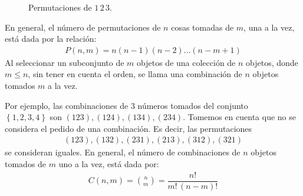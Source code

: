 \documentclass[hidelinks,12pt]{article}
\begin{document}
\begin{figure}[H]
    \centering
    \hspace{2cm}
    \caption{Permutaciones de $1 \, 2 \, 3$.}
    \label{fig:figura_01_01}
\end{figure}
En general, el número de permutaciones de $n$ cosas tomadas de $m$, una a la vez, está dada por la relación:
\begin{align*}
P (n, m) = n (n - 1)(n - 2) \ldots (n - m +1)
\end{align*}
Al seleccionar un subconjunto de $m$ objetos de una colección de $n$ objetos, donde $m \leq n$, sin tener en cuenta el orden, se llama una combinación de $n$ objetos tomados $m$ a la vez.
\par
Por ejemplo, las combinaciones de $3$ números tomados del conjunto \\ $\left\{ 1, 2, 3, 4 \right\}$ son $(123), (124), (134), (234)$. Tomemos en cuenta que no se considera el pedido de una combinación. Es decir, las permutaciones
\begin{align*}
(123), (132), (231), (213), (312), (321)
\end{align*}
se consideran iguales. En general, el número de combinaciones de $n$ objetos tomados de $m$ uno a la vez, está dada por:
\begin{align*}
C(n, m) = \binom{n}{m} = \dfrac{n!}{m! \, (n - m)!}
\end{align*}
\end{document}
